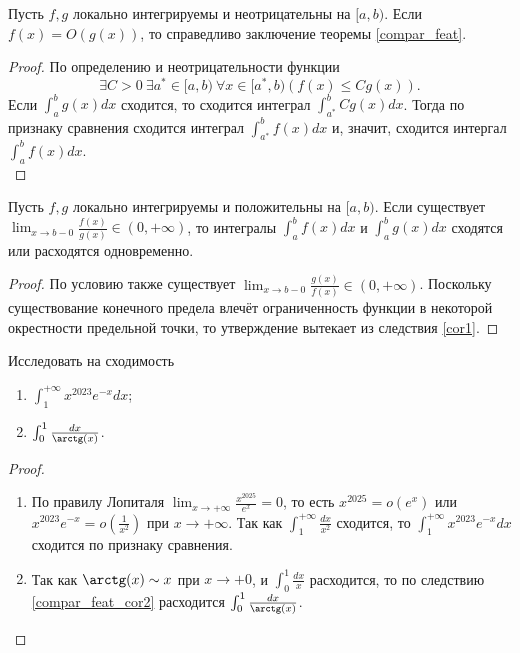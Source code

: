\begin{corollary}
    \label{cor1}
    Пусть $f, g$ локально интегрируемы и неотрицательны на $[a, b)$. Если $f(x) = O(g(x))$, то справедливо заключение теоремы \ref{compar_feat}.
\end{corollary}

\begin{proof}
    По определению и неотрицательности функции
    \[
        \exists C > 0 \ \exists a^{*} \in [a, b) \ \forall x \in [a^{*}, b) \left(f(x) \leq C g(x)\right).
    \]
    Если $\int_{a}^{b} g(x) dx$ сходится, то сходится интеграл $\int_{a^{*}}^{b} C g(x) dx$. Тогда по признаку сравнения сходится интеграл $\int_{a^{*}}^{b} f(x) dx$ и, значит, сходится интергал $\int_{a}^{b} f(x) dx$. \\
\end{proof}

\begin{corollary}
    \label{compar_feat_cor2}
    Пусть $f, g$ локально интегрируемы и положительны на $[a, b)$. Если существует $\lim_{x \to b - 0} \frac{f(x)}{g(x)} \in (0, +\infty)$, то интегралы $\int_{a}^{b} f(x) dx$ и $\int_{a}^{b} g(x) dx$ сходятся или расходятся одновременно.
\end{corollary}

\begin{proof}
    По условию также существует $\lim_{x \to b - 0} \frac{g(x)}{f(x)} \in (0, +\infty)$. Поскольку существование конечного предела влечёт ограниченность функции в некоторой окрестности предельной точки, то утверждение вытекает из следствия \ref{cor1}.
\end{proof}

\begin{example}
    Исследовать на сходимость
    \begin{enumerate}
        \item $\int_{1}^{+\infty} x^{2023} e^{-x} dx$;
        \item $\int_{0}^{1} \frac{dx}{\arctg(x)}$.
    \end{enumerate}
\end{example}

\begin{proof}
    \begin{enumerate}
        \item По правилу Лопиталя $\lim_{x \to +\infty} \frac{x^{2025}}{e^{x}} = 0$, то есть $x^{2025} = o(e^x)$ или $x^{2023}e^{-x} = o\left(\frac{1}{x^{2}}\right)$ при $x \to +\infty$. Так как $\int_{1}^{+\infty} \frac{dx}{x^2}$ сходится, то $\int_{1}^{+\infty} x^{2023}e^{-x} dx$ сходится по признаку сравнения.
        
        \item Так как $\arctg(x) \sim x$ при $x \to +0$, и $\int_{0}^{1}\frac{dx}{x}$ расходится, то по следствию \ref{compar_feat_cor2} расходится $\int_{0}^{1} \frac{dx}{\arctg(x)}$.
    \end{enumerate}
\end{proof}

